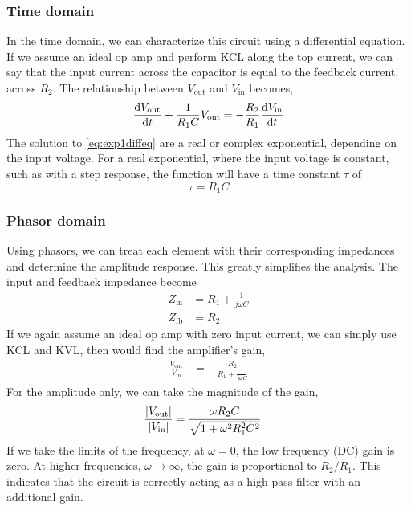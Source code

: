 \documentclass{report}
\begin{document}
	\subsubsection{Time domain}
	In the time domain, we can characterize this circuit using a differential equation. If we assume an ideal op amp and perform KCL along the top current, we can say that the input current across the capacitor is equal to the feedback current, across $R_2$. The relationship between $V_\mathrm{out}$ and $V_\mathrm{in}$ becomes,
	\begin{equation}
		\dv{V_\mathrm{out}}{t} + \frac{1}{R_1 C} V_\mathrm{out} = -\frac{R_2}{R_1} \dv{V_\mathrm{in}}{t} \label{eq:exp1diffeq}
	\end{equation}
	The solution to \eqref{eq:exp1diffeq} are a real or complex exponential, depending on the input voltage. For a real exponential, where the input voltage is constant, such as with a step response, the function will have a time constant $\tau$ of
	\begin{equation}
		\tau = R_1 C \label{eq:exp1tau}
	\end{equation}

	\subsubsection{Phasor domain}
	Using phasors, we can treat each element with their corresponding impedances and determine the amplitude response. This greatly simplifies the analysis. The input and feedback impedance become
	\begin{subequations}
		\begin{align}
			Z_\mathrm{in} & = R_1 + \frac{1}{j\omega C} \\
			Z_\mathrm{fb} & = R_2
		\end{align}
	\end{subequations}
	If we again assume an ideal op amp with zero input current, we can simply use KCL and KVL, then would find the amplifier's gain,
	\begin{align}
	\frac{V_\mathrm{out}}{V_\mathrm{in}} & = -\frac{R_2}{R_1 + \frac{1}{j\omega C}} \label{eq:exp1gain}
	\end{align}
	For the amplitude only, we can take the magnitude of the gain,
	\begin{align}
		\frac{\abs{V_\mathrm{out}}}{\abs{V_\mathrm{in}}} & = \frac{\omega R_2 C}{\sqrt{1 + \omega^2 R_1^2 C^2}} \label{eq:exp1dcgain}
	\end{align}
	If we take the limits of the frequency, at $\omega = 0$, the low frequency (DC) gain is zero. At higher frequencies, $\omega \to \infty$, the gain is proportional to $R_2 / R_1$. This indicates that the circuit is correctly acting as a high-pass filter with an additional gain.
	
\end{document}
